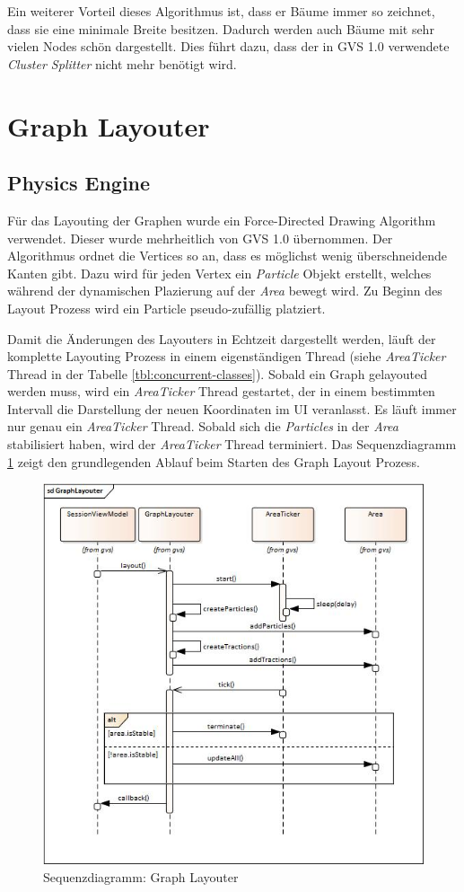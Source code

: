 \documentclass[11pt,a4paper,english,oneside]{book}
\numberwithin{equation}{chapter}
\begin{document}
	\noindent
	Ein weiterer Vorteil dieses Algorithmus ist, dass er Bäume immer so zeichnet, dass sie eine minimale Breite besitzen. Dadurch werden auch Bäume mit sehr vielen Nodes schön dargestellt. Dies führt dazu, dass der in GVS 1.0 \cite{gvs1} verwendete \textit{Cluster Splitter} nicht mehr benötigt wird. 
	
	
	
	\section{Graph Layouter}
	
	\subsection{Physics Engine} \label{ssec:graphlayouter}
	Für das Layouting der Graphen wurde ein Force-Directed Drawing Algorithm verwendet. Dieser wurde mehrheitlich von GVS 1.0 übernommen. Der Algorithmus ordnet die Vertices so an, dass es möglichst wenig überschneidende Kanten gibt. Dazu wird für jeden Vertex ein \textit{Particle} Objekt erstellt, welches während der dynamischen Plazierung auf der \textit{Area} bewegt wird. Zu Beginn des Layout Prozess wird ein Particle pseudo-zufällig platziert.
	
	Damit die Änderungen des Layouters in Echtzeit dargestellt werden, läuft der komplette Layouting Prozess in einem eigenständigen Thread (siehe \textit{AreaTicker} Thread in der Tabelle \ref{tbl:concurrent-classes}). Sobald ein Graph gelayouted werden muss, wird ein \textit{AreaTicker} Thread gestartet, der in einem bestimmten Intervall die Darstellung der neuen Koordinaten im UI veranlasst. Es läuft immer nur genau ein \textit{AreaTicker} Thread. Sobald sich die \textit{Particles} in der \textit{Area} stabilisiert haben, wird der \textit{AreaTicker} Thread terminiert. Das Sequenzdiagramm \ref{fig:sequencegraphlayouter} zeigt den grundlegenden Ablauf beim Starten des Graph Layout Prozess.
	
	\begin{figure}[h!]
		\centering
		\includegraphics[width=0.6\linewidth]{assets/images/sequence_graph_layouter}
		\caption{Sequenzdiagramm: Graph Layouter}
		\label{fig:sequencegraphlayouter}
	\end{figure}
	
\end{document}
